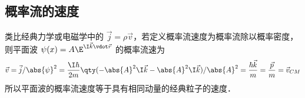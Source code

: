 \subsection{概率流的速度}

类比经典力学或电磁学中的 $\vec j = \rho \vec v$，若定义概率流速度为概率流除以概率密度，则平面波 $\psi (x) = A\E^{\I \vec k \vdot \vec r}$ 的概率流速为
\begin{equation}
\vec v = \vec j/\abs{\psi}^2 = \frac{\I\hbar}{2m} \qty(-\abs{A}^2 \I\vec k - \abs{A}^2 \I\vec k)/\abs{A}^2 = \frac{\hbar \vec k}{m} = \frac{\vec p}{m} = \vec v_{CM}
\end{equation}
所以平面波的概率流速度等于具有相同动量的经典粒子的速度．
